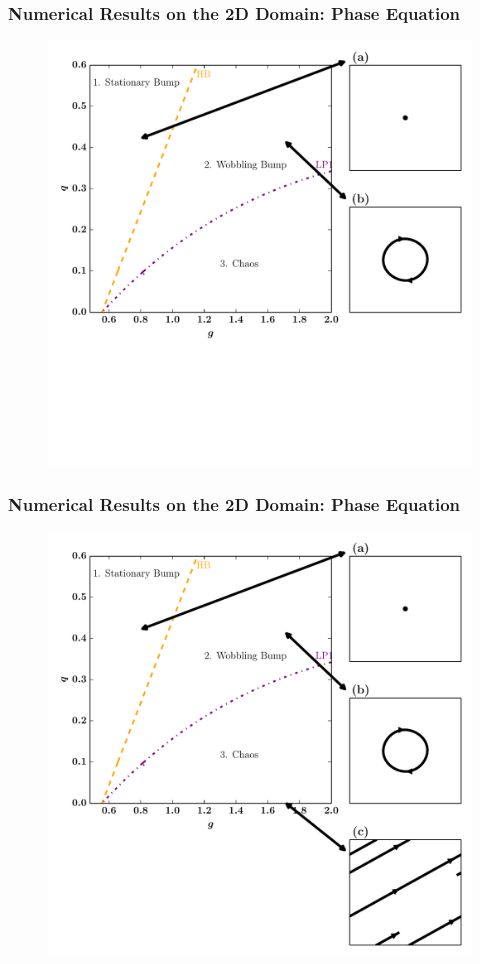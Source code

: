 \documentclass{beamer}
\begin{document}
\begin{frame}
\frametitle{Numerical Results on the 2D Domain: Phase Equation}
\begin{figure}
 \includegraphics[width=.6\textwidth]{twod_phase_2par2.pdf}

\end{figure}
\end{frame}

\begin{frame}
\frametitle{Numerical Results on the 2D Domain: Phase Equation}
\begin{figure}
 \includegraphics[width=.6\textwidth]{twod_phase_2par3.pdf}

\end{figure}
\end{frame}
\end{document}
